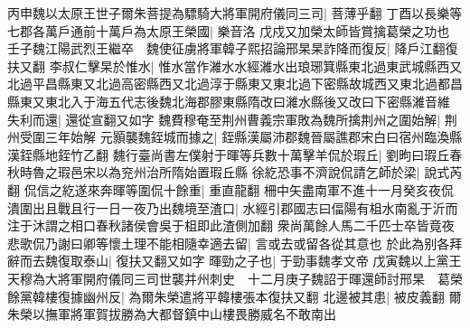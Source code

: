 丙申魏以太原王世子爾朱菩提為驃騎大將軍開府儀同三司|{
	菩薄乎翻}
丁酉以長樂等七郡各萬戶通前十萬戶為太原王榮國|{
	樂音洛}
戊戍又加榮太師皆賞擒葛榮之功也　壬子魏江陽武烈王繼卒　魏使征虜將軍韓子熙招論邢杲杲詐降而復反|{
	降戶江翻復扶又翻}
李叔仁擊杲於惟水|{
	惟水當作濰水水經濰水出琅琊箕縣東北過東武城縣西又北過平昌縣東又北過高密縣西又北過淳于縣東又東北過下密縣故城西又東北過都昌縣東又東北入于海五代志後魏北海郡膠東縣隋改曰濰水縣後又改曰下密縣濰音維}
失利而還|{
	還從宣翻又如字}
魏費穆奄至荆州曹義宗軍敗為魏所擒荆州之圍始解|{
	荆州受圍三年始解}
元顥襲魏銍城而據之|{
	銍縣漢屬沛郡魏晉屬譙郡宋白曰宿州臨渙縣漢銍縣地銍竹乙翻}
魏行臺尚書左僕射于暉等兵數十萬擊羊侃於瑕丘|{
	劉昫曰瑕丘春秋時魯之瑕邑宋以為兖州治所隋始置瑕丘縣}
徐紇恐事不濟說侃請乞師於梁|{
	說式芮翻}
侃信之紇遂來奔暉等圍侃十餘重|{
	重直龍翻}
柵中矢盡南軍不進十一月癸亥夜侃潰圍出且戰且行一日一夜乃出魏境至渣口|{
	水經引郡國志曰偪陽有柤水南亂于沂而注于沐謂之相口春秋諸侯會吳于柤即此渣側加翻}
衆尚萬餘人馬二千匹士卒皆竟夜悲歌侃乃謝曰卿等懷土理不能相隨幸適去留|{
	言或去或留各從其意也}
於此為别各拜辭而去魏復取泰山|{
	復扶又翻又如字}
暉勁之子也|{
	于勁事魏孝文帝}
戊寅魏以上黨王天穆為大將軍開府儀同三司世襲并州刺史　十二月庚子魏詔于暉還師討邢杲　葛榮餘黨韓樓復據幽州反|{
	為爾朱榮遣將平韓樓張本復扶又翻}
北邊被其患|{
	被皮義翻}
爾朱榮以撫軍將軍賀拔勝為大都督鎮中山樓畏勝威名不敢南出

